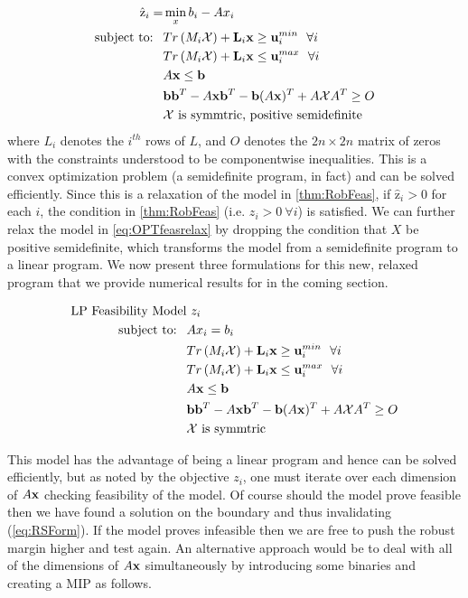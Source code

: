 \begin{subequations}\label{eq:OPTfeasrelax}
\begin{align}
\hat{\mathrm{z}}_{i} = &\min_x b_i-Ax_i  \\
 \text{subject to: } \ &Tr\left(M_i\mathcal{X}\right)+\bold L_i\bold x \geq \bold u_i^{min} \ \ \forall i\\
 & Tr\left(M_i\mathcal{X}\right)+\bold L_i\bold x \leq \bold u_i^{max} \ \ \forall i\\
 	&A\bold x\leq \bold b \\
 	&\bold b\bold b^T-A\bold x\bold b^T-\bold b(A\bold x)^T+A\mathcal{X}A^T\geq O \\
 	&\mathcal{X} \text{ is symmtric, positive semidefinite}
\end{align}
\end{subequations}
where $L_i$ denotes the $i^{th}$ rows of $L$, and $O$ denotes the $2n \times 2n$ matrix of zeros with the constraints understood to be componentwise inequalities. 
This is a convex optimization problem (a semidefinite program, in fact) and can be solved efficiently. 
Since this is a relaxation of the model in \cref{thm:RobFeas}, if $\hat{\mathrm{z}}_i>0$ for each $i$, the condition in \cref{thm:RobFeas} (i.e. $z_i>0 \ \forall i$) is satisfied. 
We can further relax the model in \eqref{eq:OPTfeasrelax} by dropping the condition that $X$ be positive semidefinite, which transforms the model from a semidefinite program to a linear program. 
We now present three formulations for this new, relaxed program that we provide numerical results for in the coming section.

\begin{subequations}\label{eq:OPTfeasrelaxLP1}
\begin{align}
 \text{LP Feasibility Model}& \ z_i  \\
 \text{subject to: } \ &Ax_i= b_i \\
 &Tr\left(M_i\mathcal{X}\right)+\bold L_i\bold x \geq \bold u_i^{min}  \ \ \forall i\\
 & Tr\left(M_i\mathcal{X}\right)+\bold L_i\bold x \leq \bold u_i^{max}  \ \ \forall i\\
 	&A\bold x\leq \bold b \\
 	&\bold b\bold b^T-A\bold x\bold b^T-\bold b(A\bold x)^T+A\mathcal{X}A^T\geq O \\
 	&\mathcal{X} \text{ is symmtric}
\end{align}
\end{subequations}

This model has the advantage of being a linear program and hence can be solved efficiently, but as noted by the objective $z_i$, one must iterate over each dimension of $A\bold x$ checking feasibility of the model. 
Of course should the model prove feasible then we have found a solution on the boundary and thus invalidating (\ref{eq:RSForm}). 
If the model proves infeasible then we are free to push the robust margin higher and test again. 
An alternative approach would be to deal with all of the dimensions of $A\bold x$ simultaneously by introducing some binaries and creating a MIP as follows. 

